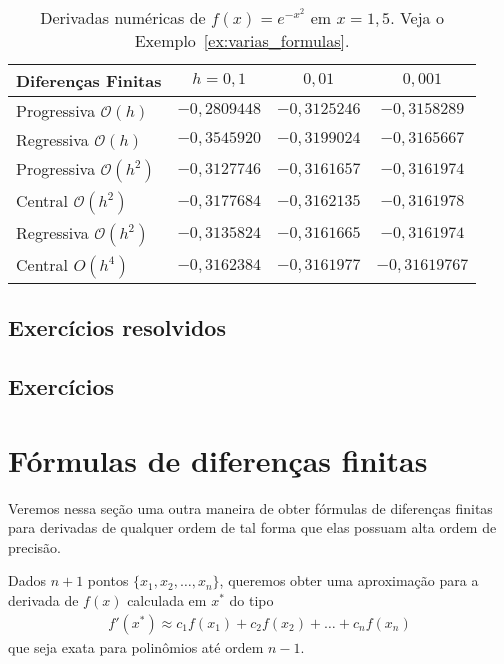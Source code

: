 \begin{sol}
\begin{table}
  \centering
  \begin{tabular}{l|ccc}
    Diferenças Finitas & $h=0,1$ & $0,01$ & $0,001$\\\hline
    Progressiva $\mathcal{O}(h)$ & $-0,2809448$ & $-0,3125246$ & $-0,3158289$\\
    Regressiva $\mathcal{O}(h)$ & $-0,3545920$ & $-0,3199024$ & $-0,3165667$\\
    Progressiva $\mathcal{O}(h^2)$ & $-0,3127746$ & $-0,3161657$ & $-0,3161974$\\
    Central $\mathcal{O}(h^2)$ & $-0,3177684$ & $-0,3162135$ & $-0,3161978$ \\
    Regressiva $\mathcal{O}(h^2)$ & $-0,3135824$ & $-0,3161665$ & $-0,3161974$\\
    Central $O(h^4)$ & $-0,3162384$ & $-0,3161977$ & $-0,31619767$ \\\hline
  \end{tabular}
  \caption{Derivadas numéricas de $f(x) = e^{-x^ 2}$ em $x=1,5$. Veja o Exemplo~\ref{ex:varias_formulas}.}
  \label{tab:ex_varias_formulas}
\end{table}
\end{sol}

\subsection{Exercícios resolvidos}

\construirExeresol

\subsection*{Exercícios}

\construirExer


\section{Fórmulas de diferenças finitas}

Veremos nessa seção uma outra maneira de obter fórmulas de diferenças finitas para derivadas de qualquer ordem de tal forma que elas possuam alta ordem de precisão.

Dados $n+1$ pontos $\{x_1, x_2,\dotsc, x_n\}$, queremos obter uma aproximação para a derivada de $f(x)$ calculada em $x^*$ do tipo
\begin{eqnarray}\label{eq:regradif}
  f'(x^*)\approx c_1f(x_1)+c_2f(x_2)+\ldots +c_nf(x_n)
\end{eqnarray}
que seja exata para polinômios até ordem $n-1$.

